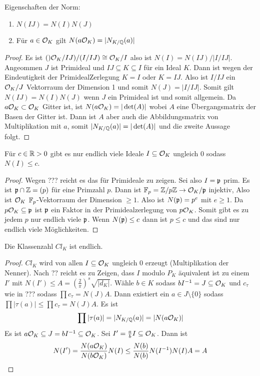 \begin{Lemma}
	Eigenschaften der Norm:
	\begin{enumerate}
		\item \(N(IJ)=N(I)N(J)\)
		\item Für \(a\in \mathcal{O}_K\) gilt \(N(a\mathcal{O}_K)=|N_{K/\mathbb{Q}}(a)|\)
	\end{enumerate}
\end{Lemma}
\begin{proof}
	Es ist \(()\mathcal{O}_K/IJ)/(I/IJ)\cong \mathcal{O}_K/I\)
	also ist \(N(I)=N(IJ)/|I/IJ|\).
	Angeommen \(J\) ist Primideal und \(IJ\subseteq K\subseteq I\) für ein Ideal \(K\). Dann ist
	wegen der Eindeutigkeit der PrimidealZerlegung \(K=I\) oder \(K=IJ\).
	Also ist \(I/IJ\) ein \(\mathcal{O}_K/J\) Vektorraum der Dimension 1 und somit \(N(J)=|I/IJ|\).
	Somit gilt \(N(IJ)=N(I)N(J)\) wenn \(J\) ein Primideal ist
	und somit allgemein.
	Da \(a\mathcal{O}_K\subset \mathcal{O}_K\) Gitter ist,
	ist \(N(a\mathcal{O}_K)=|\det(A)|\) wobei \(A\) eine Übergangsmatrix der Basen der Gitter ist.
	Dann ist \(A\) aber auch die Abbildungsmatrix von Multiplikation mit \(a\), somit \(|N_{K/\mathbb{Q}}(a)|=|\det(A)|\) und die zweite Aussage folgt.
\end{proof}
\begin{Lemma}
	Für \(c\in \mathbb{R}>0\) gibt es nur endlich viele Ideale 
	\(I\subseteq \mathcal{O}_K\) ungleich 0 sodass
	\(N(I)\leq c\).
\end{Lemma}
\begin{proof}
	Wegen ??? reicht es das für Primideale zu zeigen.
	Sei also \(I=\mathfrak{p}\) prim. Es ist \(\mathfrak{p}\cap \mathbb{Z}=(p)\) für eine Primzahl \(p\).
	Dann ist \(\mathbb{F}_p=\mathbb{Z}/p\mathbb{Z}\to \mathcal{O}_K/\mathfrak{p}\) injektiv,
	Also ist \(\mathcal{O}_K\) \(\mathbb{F}_p\)-Vektorraum der Dimension \(\geq 1\).
	Also ist \(N(\mathfrak{p})=p^e\) mit \(e\geq 1\).
	Da \(p\mathcal{O}_K\subseteq\mathfrak{p}\) ist \(\mathfrak{p}\) ein Faktor in der Primidealzerlegung von \(p\mathcal{O}_K\).
	Somit gibt es zu jedem \(p\) nur endlich viele \(\mathfrak{p}\).
	Wenn \(N(\mathfrak{p})\leq c\) dann ist \(p\leq c\) und das sind nur endlich viele Möglichkeiten.
\end{proof}
\begin{Satz}
	Die Klassenzahl \(Cl_K\) ist endlich.
\end{Satz}
\begin{proof}
	\(Cl_K\) wird von allen \(I\subseteq \mathcal{O}_K\) ungleich 0 erzeugt (Multiplikation der Nenner).
	Nach ?? reicht es zu Zeigen, dass \(I\) modulo \(P_K\) äquivalent ist zu einem \(I'\) mit \(N(I')\leq A=(\frac 2 \pi)^s\sqrt{|d_K|}\).
	Wähle \(b\in K\) sodass \(bI^{-1}=J\subseteq\mathcal{O}_K\) und 
	\(c_\tau\) wie in ??? sodass \(\prod c_\tau=N(J)A\).
	Dann existiert ein \(a\in J\setminus\{0\}\) sodass
	\(\prod |\tau(a)|\leq \prod c_\tau=N(J)A\).
	Es ist
	\[\prod |\tau(a)|=|N_{K/\mathbb{Q}}(a)|=|N(a\mathcal{O}_K)|\]
	Es ist \(a\mathcal{O}_K\subseteq J=bI^{-1}\subseteq \mathcal{O}_K\).
	Sei \(I'=\frac a b I\subseteq \mathcal{O}_K\).
	Dann ist \[N(I')=\dfrac{N(a\mathcal{O}_K)}{N(b\mathcal{O}_K)}N(I)\leq \dfrac{N(b)}{N(b)}N(I^{-1})N(I)A=A\]
\end{proof}
